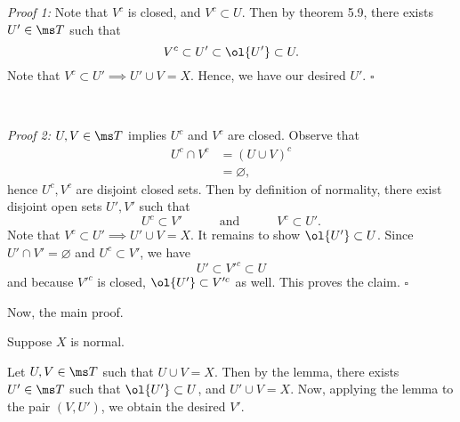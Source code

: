 \documentclass{fkpset}
\begin{document}
\begin{solution}
\begin{leftbar}
      \begin{adjustwidth}{.025\linewidth}{.025\linewidth}
        \color{RedOrange}
        \begin{boxedminipage}{\linewidth}
          \emph{Proof 1:} Note that $V^c$ is closed, and $V^c \subset
          U$. Then by theorem 5.9, there exists $U' \in \ms T$ such
          that
          \[
            V^c \subset U' \subset \ol{U'} \subset U.
          \]
          Note that $V^c \subset U' \implies U' \cup V = X$. Hence, we
          have our desired $U'$. \hfill $\square$
        \end{boxedminipage}
      \end{adjustwidth}
      ~
      \begin{adjustwidth}{.025\linewidth}{.025\linewidth}
        \color{TealBlue}
        \begin{boxedminipage}{\linewidth}
          \emph{Proof 2:} $U,V \in \ms T$ implies $U^c$ and $V^c$ are
          closed. Observe that
          \begin{align*}
            U^c \cap V^c
            &= (U \cup V)^c \\
            &= \varnothing,
          \end{align*}
          hence $U^c, V^c$ are disjoint closed sets. Then by
          definition of normality, there exist disjoint open sets
          $U',V'$ such that
          \[
            U^c \subset V' \qquad\quad \text{and} \quad\qquad V^c
            \subset U'.
          \]
          Note that $V^c \subset U' \implies U' \cup V = X$. It
          remains to show $\ol{U'} \subset U$. Since $U' \cap V' =
          \varnothing$ and $U^c \subset V'$, we have
          \[
            U' \subset V'^c \subset U
          \]
          and because $V'^c$ is closed, $\ol{U'} \subset V'^c$ as
          well. This proves the claim. \hfill $\square$
        \end{boxedminipage}
      \end{adjustwidth}
      Now, the main proof.
    \end{leftbar}

    \begin{iffproof}
    \item Suppose $X$ is normal.

        Let $U,V \in \ms T$ such that $U \cup V = X$. Then by the
        lemma, there exists $U' \in \ms T$ such that $\ol{U'} \subset
        U$, and $U' \cup V = X$. Now, applying the lemma to the pair
        $(V, U')$, we obtain the desired $V'$. \cmark


\end{iffproof}
\end{solution}
\end{document}
